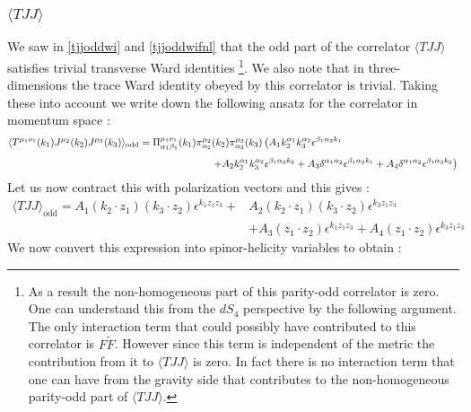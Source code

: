 \documentclass[a4paper,11pt]{article}
\begin{document}
\subsubsection*{$\langle TJJ \rangle$}
We saw in \eqref{tjjoddwi} and \eqref{tjjoddwifnl} that the odd part of the correlator $\langle TJJ \rangle$ satisfies trivial transverse Ward identities \footnote{As a result the non-homogeneous part of this parity-odd correlator is zero. One can understand this from the $dS_4$ perspective by the following argument. The only interaction term that could possibly have contributed to this correlator is $F\widetilde F$. However since this term is independent of the metric the contribution from it to $\langle TJJ\rangle$ is zero. In fact there is no interaction term that one can have from the gravity side that contributes to the non-homogeneous parity-odd part of $\langle TJJ\rangle$.}.
% 
We also note that in three-dimensions the trace Ward identity obeyed by this correlator is trivial. Taking these into account we write down the following ansatz for the correlator in momentum space :
%
\begin{align}
\langle T^{\mu_1\nu_1}(k_1)J^{\mu_2}(k_2)J^{\mu_3}(k_3)\rangle_{\text{odd}}&=\Pi^{\mu_1\nu_1}_{\alpha_1\beta_1}(k_1)\pi^{\mu_2}_{\alpha_2}(k_2)\pi^{\mu_3}_{\alpha_3}(k_3)\left(A_1 k_2^{\alpha_1}k_3^{\alpha_2}\epsilon^{\beta_1\alpha_3k_1}\right.\nonumber\\[4 pt]
&\hspace{2.5cm}\left.+A_2k_2^{\alpha_1}k_3^{\alpha_2}\epsilon^{\beta_1\alpha_3 k_3}
+A_3\delta^{\alpha_1\alpha_2}\epsilon^{\beta_1\alpha_3 k_1}+A_4\delta^{\alpha_1\alpha_2}\epsilon^{\beta_1\alpha_3 k_3}\right)
\end{align}
%
Let us now contract this with polarization vectors and this gives :
\begin{align}\label{jjta1a2}
\langle T J J\rangle_{\text{odd}}=A_{1}(k_2 \cdot z_1)(k_3 \cdot z_2)\epsilon^{k_1 z_1 z_3}+&A_2 (k_2 \cdot z_1)(k_3 \cdot z_2)\epsilon^{k_3 z_1 z_3}\nonumber\\[4 pt]
&+A_3 (z_1 \cdot z_2)\epsilon^{k_1 z_1 z_3}+A_4 (z_1 \cdot z_2)\epsilon^{k_3 z_1 z_3}
\end{align}
We now convert this expression into spinor-helicity variables to obtain :
\end{document}
